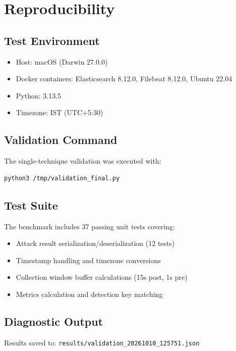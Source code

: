 \documentclass[11pt,a4paper]{article}
\begin{document}
\section{Reproducibility}

\subsection{Test Environment}

\begin{itemize}
    \item Host: macOS (Darwin 27.0.0)
    \item Docker containers: Elasticsearch 8.12.0, Filebeat 8.12.0, Ubuntu 22.04
    \item Python: 3.13.5
    \item Timezone: IST (UTC+5:30)
\end{itemize}

\subsection{Validation Command}

The single-technique validation was executed with:

\begin{lstlisting}[language=bash]
python3 /tmp/validation_final.py
\end{lstlisting}

\subsection{Test Suite}

The benchmark includes 37 passing unit tests covering:
\begin{itemize}
    \item Attack result serialization/deserialization (12 tests)
    \item Timestamp handling and timezone conversions
    \item Collection window buffer calculations (15s post, 1s pre)
    \item Metrics calculation and detection key matching
\end{itemize}

\subsection{Diagnostic Output}

Results saved to: \texttt{results/validation\_20261010\_125751.json}
\end{document}

